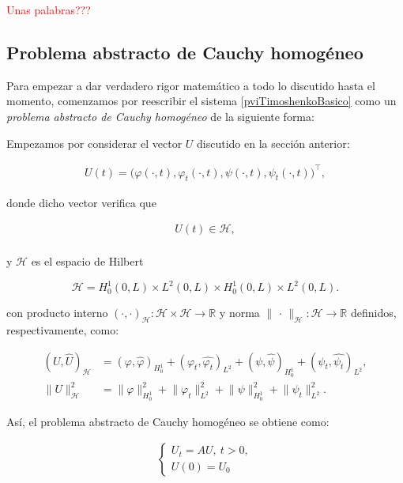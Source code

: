 \textcolor{red}{Unas palabras???}

\subsection{Problema abstracto de Cauchy homogéneo}
\label{ch:teoriaVigas:section:timoshenkoFunc:subsection:cauchyHom}

Para empezar a dar verdadero rigor matemático a todo lo discutido hasta el momento, comenzamos por reescribir el sistema \eqref{pviTimoshenkoBasico} como un \textit{problema abstracto de Cauchy homogéneo} de la siguiente forma:

Empezamos por considerar el vector $U$ discutido en la sección anterior:

\begin{align*}
    U(t) = \Big(\varphi(\cdot, t), \varphi_t(\cdot, t), \psi(\cdot, t), \psi_t(\cdot, t)\Big)^\top,
\end{align*}

donde dicho vector verifica que

\begin{align*}
    U(t) \in \mathcal{H},\\
\end{align*}

y $\mathcal{H}$ es el espacio de Hilbert

\[\mathcal{H} = H_0^1(0,L) \times L^2(0,L) \times H_0^1(0,L) \times L^2(0,L).\]

con producto interno $(\cdot, \cdot)_{\mathcal{H}} : \mathcal{H}\times \mathcal{H} \rightarrow \mathbb{R}$ y norma $\lVert \, \cdot \, \rVert_{\mathcal{H}} : \mathcal{H} \rightarrow \mathbb{R}$ definidos, respectivamente, como:

\begin{align}
    (U, \hat{U})_{\mathcal{H}} &= (\varphi, \hat{\varphi})_{H_0^1} + (\varphi_t, \hat{\varphi_t})_{L^2} + (\psi, \hat{\psi})_{H_0^1} + (\psi_t, \hat{\psi_t})_{L^2},\label{prodEscalarHTimoBasico}\\
    \lVert U \rVert_{\mathcal{H}}^2 &= \lVert \varphi \rVert_{H_0^1}^2 + \lVert \varphi_t \rVert_{L^2}^2 + \lVert \psi \rVert_{H_0^1}^2 + \lVert \psi_t \rVert_{L^2}^2.\label{normaHTimoBasico}
\end{align}

Así, el problema abstracto de Cauchy homogéneo se obtiene como:

\begin{align}
    \label{probCauchyHomTimoBasico}
    \begin{cases}
        U_t = AU, \ t > 0,\\
        U(0) = U_0
    \end{cases}
\end{align}

